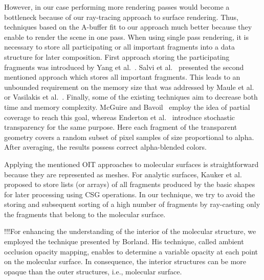 However, in our case performing more rendering passes would become a bottleneck because of our ray-tracing approach to surface rendering.
Thus, techniques based on the A-buffer fit to our approach much better because they enable to render the scene in one pass.
When using single pass rendering, it is necessary to store all participating or all important fragments into a data structure for later composition.
First approach storing the participating fragments was introduced by Yang et al.~\cite{yang2010real}. Salvi et al.~\cite{salvi2011adaptive} presented the second mentioned approach which stores all important fragments.
This leads to an unbounded requirement on the memory size that was addressed by Maule et al.~\cite{maule2012memory} or Vasilakis et al.~\cite{vasilakis2015k+buffer}.
Finally, some of the existing techniques aim to decrease both time and memory complexity.
McGuire and Bavoil~\cite{mcguire2013weighted} employ the idea of partial coverage to reach this goal, whereas Enderton et al.~\cite{enderton2011stochastic} introduce stochastic transparency for the same purpose. 
Here each fragment of the transparent geometry covers a random subset of pixel samples of size proportional to alpha. 
After averaging, the results possess correct alpha-blended colors. 

Applying the mentioned OIT approaches to molecular surfaces is straightforward because they are represented as meshes.
For analytic surfaces, Kauker et al.~\cite{kauker2013rendering} proposed to store lists (or arrays) of all fragments produced by the basic shapes for later processing using CSG operations.
In our technique, we try to avoid the storing and subsequent sorting of a high number of fragments by ray-casting only the fragments that belong to the molecular surface.


!!!For enhancing the understanding of the interior of the molecular structure, we employed the technique presented by Borland\cite{borland2011ambient}. 
His technique, called ambient occlusion opacity mapping, enables to determine a variable opacity at each point on the molecular surface.
In consequence, the interior structures can be more opaque than the outer structures, i.e., molecular surface.


